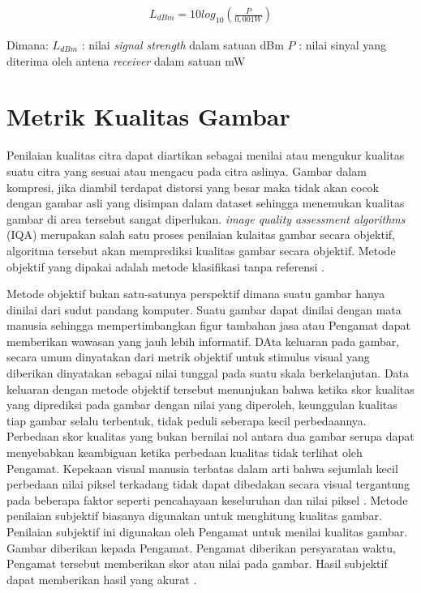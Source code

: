 \begin{equation}
	\begin{aligned}
		L_{dBm}=10log_{10}\left ( \frac{P}{0,001W} \right)
	\end{aligned}
\end{equation}

Dimana:
\newline
$L_{dBm}$ 		\hspace{0.4cm}: nilai \textit{signal strength} dalam satuan dBm \newline
$P$ 	\hspace{1cm}: nilai sinyal yang diterima oleh antena \textit{receiver} dalam satuan mW \newline

\section{Metrik Kualitas Gambar}
\hspace{1,2cm}Penilaian kualitas citra dapat diartikan sebagai menilai atau mengukur kualitas suatu citra yang sesuai atau mengacu pada citra aslinya. Gambar dalam kompresi, jika diambil terdapat distorsi yang besar maka tidak akan cocok dengan gambar asli yang disimpan dalam dataset sehingga menemukan kualitas gambar di area tersebut sangat diperlukan. \textit{image quality assessment algorithms} (IQA) merupakan salah satu proses penilaian kulaitas gambar secara objektif, algoritma tersebut akan memprediksi kualitas gambar secara objektif. Metode objektif yang dipakai adalah metode klasifikasi tanpa referensi \citep{Kumar2015}.

Metode objektif bukan satu-satunya perspektif dimana suatu gambar hanya dinilai dari sudut pandang komputer. Suatu gambar dapat dinilai dengan mata manusia sehingga mempertimbangkan figur tambahan jasa atau Pengamat dapat memberikan wawasan yang jauh lebih informatif. DAta keluaran pada gambar, secara umum dinyatakan dari metrik objektif untuk stimulus visual yang diberikan dinyatakan sebagai nilai tunggal pada suatu skala berkelanjutan. Data keluaran dengan metode objektif tersebut menunjukan bahwa ketika skor kualitas yang diprediksi pada gambar dengan nilai yang diperoleh, keunggulan kualitas tiap gambar selalu terbentuk, tidak peduli seberapa kecil perbedaannya. Perbedaan skor kualitas yang bukan bernilai nol antara dua gambar serupa dapat menyebabkan keambiguan ketika perbedaan kualitas tidak terlihat oleh Pengamat. Kepekaan visual manusia terbatas dalam arti bahwa sejumlah kecil perbedaan nilai piksel terkadang tidak dapat dibedakan secara visual tergantung pada beberapa faktor seperti pencahayaan keseluruhan dan nilai piksel \citep{Cheon2021}.  Metode penilaian subjektif biasanya digunakan untuk menghitung kualitas gambar. Penilaian subjektif ini digunakan oleh Pengamat untuk menilai kualitas gambar. Gambar diberikan kepada Pengamat. Pengamat diberikan persyaratan waktu, Pengamat tersebut memberikan skor atau nilai pada gambar. Hasil subjektif dapat memberikan hasil yang akurat \citep{Kumar2015}.


